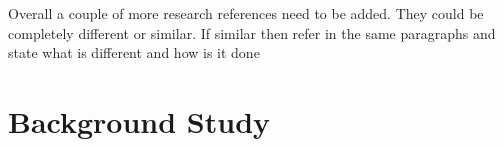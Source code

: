 \documentclass[a4paper, 11pt]{article}
\begin{document}
\color{red}
Overall a couple of more research references need to be added. They could be completely different or similar. If similar then refer in the same paragraphs and state what is different and how is it done
\color{black}







  





\section{Background Study}
\end{document}
